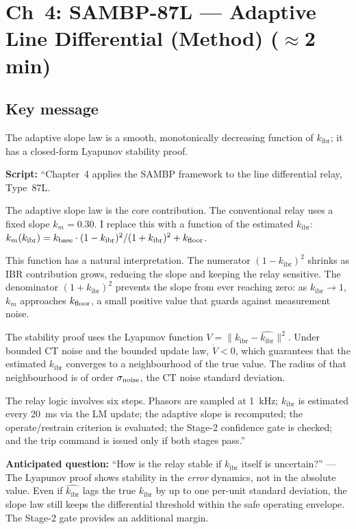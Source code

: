 \documentclass[11pt,a4paper]{article}
\newcommand{\script}[1]{\begin{scriptbox}\textbf{Script:} #1\end{scriptbox}}
\newcommand{\anticipate}[1]{\begin{warnbox}\textbf{Anticipated question:} #1\end{warnbox}}
\newcommand{\kibr}{k_{\mathrm{ibr}}}
\begin{document}
\section{Ch~4: SAMBP-87L --- Adaptive Line Differential (Method) \hfill\normalfont\small($\approx$2 min)}
\label{slide:87l_method}

\subsection*{Key message}
The adaptive slope law is a smooth, monotonically decreasing function of $\kibr$;
it has a closed-form Lyapunov stability proof.

\script{%
``Chapter~4 applies the SAMBP framework to the line differential relay, Type~87L.

The adaptive slope law is the core contribution. The conventional relay uses a fixed
slope $k_m = 0.30$. I replace this with a function of the estimated $\kibr$:
$k_m(\kibr) = k_{\rm base} \cdot (1-\kibr)^2 / (1+\kibr)^2 + k_{\rm floor}$.

This function has a natural interpretation. The numerator $(1-\kibr)^2$ shrinks as IBR
contribution grows, reducing the slope and keeping the relay sensitive. The denominator
$(1+\kibr)^2$ prevents the slope from ever reaching zero: as $\kibr \to 1$, $k_m$
approaches $k_{\rm floor}$, a small positive value that guards against measurement noise.

The stability proof uses the Lyapunov function $V = \|\kibr - \hat{\kibr}\|^2$.
Under bounded CT noise and the bounded update law, $\dot{V} < 0$, which guarantees that
the estimated $\kibr$ converges to a neighbourhood of the true value. The radius of that
neighbourhood is of order $\sigma_{\rm noise}$, the CT noise standard deviation.

The relay logic involves six steps. Phasors are sampled at 1~kHz; $\kibr$ is estimated
every 20~ms via the LM update; the adaptive slope is recomputed; the operate/restrain
criterion is evaluated; the Stage-2 confidence gate is checked; and the trip command is
issued only if both stages pass.''%
}

\anticipate{``How is the relay stable if $\kibr$ itself is uncertain?'' ---
The Lyapunov proof shows stability in the \emph{error} dynamics, not in the absolute
value. Even if $\hat{\kibr}$ lags the true $\kibr$ by up to one per-unit standard
deviation, the slope law still keeps the differential threshold within the safe operating
envelope. The Stage-2 gate provides an additional margin.}
\end{document}
